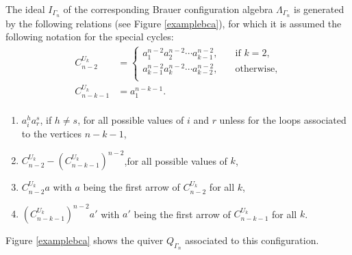 \documentclass[10pt,twoside]{article}
\newcounter{neq}
\theoremstyle{definition}
\begin{document}
The ideal $I_{\Gamma_{n}}$ of the corresponding Brauer configuration algebra $\Lambda_{\Gamma_n}$ is generated by the following relations (see Figure \ref{examplebca}), for which it is assumed the following notation for the special cycles:
\begin{equation}\label{special}
\begin{split}
C^{U_k}_{n-2}&=\begin{cases}
a_1^{n-2}a_{2}^{n-2}\cdots a_{k-1}^{n-2}, &\quad\text{if } k=2,\\
a_{k-1}^{n-2}a_{k}^{n-2}\cdots a_{k-2}^{n-2},&\quad\text{otherwise}, \\
\end{cases}\\
C^{U_k}_{n-k-1}&=a_{1}^{n-k-1}.\\
\end{split}
\end{equation}

\begin{enumerate}
\item $a^{h}_{i}a^{s}_{r}$, if $h\neq s$, for all possible values of $i$ and $r$ unless for the loops associated to the vertices $n-k-1$,

\item $C^{U_k}_{n-2}-\left(C^{U_k}_{n-k-1}\right)^{n-2}$,\quad for all possible values of $k$,

\item $C^{U_k}_{n-2} a$  with $a$  being the first arrow of $C^{U_k}_{n-2}$  for all $k$,
\item $\left(C^{U_k}_{n-k-1}\right)^{n-2}a'$ with $a'$  being the first arrow of $C^{U_k}_{n-k-1}$ for all $k$.

\end{enumerate}
\par\bigskip
Figure \ref{examplebca} shows the quiver $Q_{\Gamma_n}$ associated to this configuration.
\end{document}
